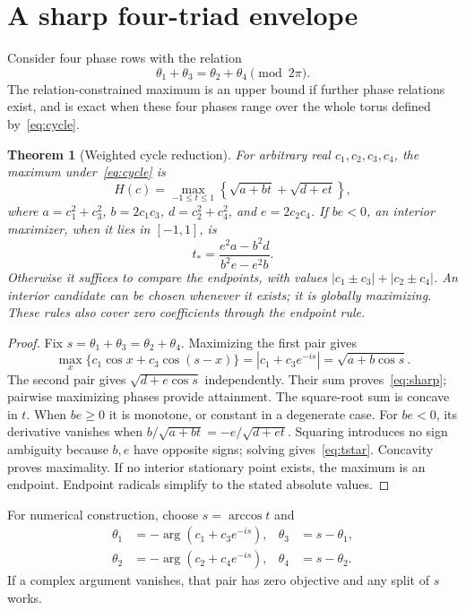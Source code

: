 \documentclass[11pt]{article}
\newtheorem{theorem}{Theorem}[section]
\begin{document}
\section{A sharp four-triad envelope}\label{sec:four}
Consider four phase rows with the relation
\begin{equation}\label{eq:cycle}
 \theta_1+\theta_3=\theta_2+\theta_4\pmod{2\pi}.
\end{equation}
The relation-constrained maximum is an upper bound if further phase relations exist, and is exact when these four phases range over the whole torus defined by~\eqref{eq:cycle}.

\begin{theorem}[Weighted cycle reduction]\label{thm:four}
For arbitrary real $c_1,c_2,c_3,c_4$, the maximum under~\eqref{eq:cycle} is
\begin{equation}\label{eq:sharp}
 H(c)=\max_{-1\le t\le1}\left\{\sqrt{a+bt}+\sqrt{d+et}\right\},
\end{equation}
where $a=c_1^2+c_3^2$, $b=2c_1c_3$, $d=c_2^2+c_4^2$, and $e=2c_2c_4$. If $be<0$, an interior maximizer, when it lies in $[-1,1]$, is
\begin{equation}\label{eq:tstar}
 t_* = \frac{e^2a-b^2d}{b^2e-e^2b}.
\end{equation}
Otherwise it suffices to compare the endpoints, with values
$|c_1\pm c_3|+|c_2\pm c_4|$. An interior candidate can be chosen whenever it exists; it is globally maximizing. These rules also cover zero coefficients through the endpoint rule.
\end{theorem}
\begin{proof}
Fix $s=\theta_1+\theta_3=\theta_2+\theta_4$. Maximizing the first pair gives
\[
 \max_x\{c_1\cos x+c_3\cos(s-x)\}=|c_1+c_3e^{-is}|=\sqrt{a+b\cos s}.
\]
The second pair gives $\sqrt{d+e\cos s}$ independently. Their sum proves~\eqref{eq:sharp}; pairwise maximizing phases provide attainment. The square-root sum is concave in $t$. When $be\ge0$ it is monotone, or constant in a degenerate case. For $be<0$, its derivative vanishes when $b/\sqrt{a+bt}=-e/\sqrt{d+et}$. Squaring introduces no sign ambiguity because $b,e$ have opposite signs; solving gives~\eqref{eq:tstar}. Concavity proves maximality. If no interior stationary point exists, the maximum is an endpoint. Endpoint radicals simplify to the stated absolute values.
\end{proof}

For numerical construction, choose $s=\arccos t$ and
\begin{align}
 \theta_1&=-\arg(c_1+c_3e^{-is}),&\theta_3&=s-\theta_1,\\
 \theta_2&=-\arg(c_2+c_4e^{-is}),&\theta_4&=s-\theta_2.
\end{align}
If a complex argument vanishes, that pair has zero objective and any split of $s$ works.
\end{document}
